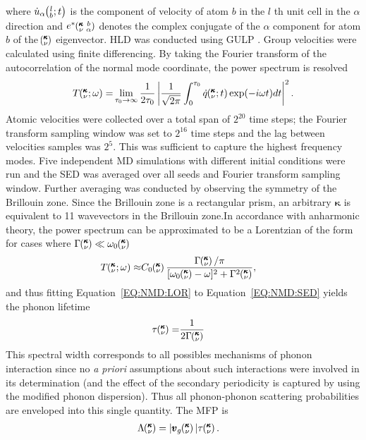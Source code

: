 \documentclass[aps,prb,preprint,preprintnumbers,amsmath,amssymb,floatfix,superscriptaddress]{revtex4}
\newcommand{\kvba}{\mspace{-4.0mu}\left(\mspace{-8.0mu}
\begin{smallmatrix} &\pmb{\kappa} &b \\ &\nu &\alpha\end{smallmatrix}
\mspace{-3.0mu}\right)}
\newcommand{\kvt}{\mspace{-4.0mu}\left(\mspace{-8.0mu}
\begin{smallmatrix}&\pmb{\kappa} \\&\nu\end{smallmatrix}
\mspace{-2.0mu};t\right)}
\newcommand{\kvw}{\mspace{-4.0mu}\left(\mspace{-8.0mu}
\begin{smallmatrix}&\pmb{\kappa} \\&\nu\end{smallmatrix}
\mspace{-2.0mu};\omega\right)}
\newcommand{\kv}{\mspace{-4.0mu}\left(\mspace{-8.0mu}
\begin{smallmatrix}&\pmb{\kappa} \\&\nu\end{smallmatrix}
\mspace{-3.0mu}\right)}
\newcommand{\lbt}{\mspace{-4.0mu}\left(\mspace{-8.0mu}
\begin{smallmatrix}&l \\&b\end{smallmatrix}\mspace{-2.0mu};t\right)}
\begin{document}
where $\dot{u}_{\alpha}\lbt$ is the component of velocity of atom $b$ in the $l$ th unit cell in the $\alpha$ direction and $e^*\kvba$ denotes the complex conjugate of the $\alpha$ component for atom $b$ of the $\kv$ eigenvector. HLD was conducted using GULP \cite{GULP}. Group velocities were calculated using finite differencing. By taking the Fourier transform of the autocorrelation of the normal mode coordinate, the power spectrum is resolved \cite{dove_introduction_1993-3}
\begin{equation}\label{EQ:NMD:SED}
\begin{split}
T\kvw=&\lim_{\tau_0\rightarrow\infty}\frac{1}{2\tau_0}\left|\frac{1}{\sqrt{2\pi}}\int_{0}^{\tau_0}\dot{q}\kvt\exp(-i\omega t)dt\right|^2.\\
\end{split}
\end{equation}
Atomic velocities were collected over a total span of $2^{20}$ time steps; the Fourier transform sampling window was set to $2^{16}$ time steps and the lag between velocities samples was $2^5$. This was sufficient to capture the highest frequency modes. Five independent MD simulations with different initial conditions were run and the SED was averaged over all seeds and Fourier transform sampling window. Further averaging was conducted by observing the symmetry of the Brillouin zone. Since the Brillouin zone is a rectangular prism, an arbitrary $\pmb{\kappa}$ is equivalent to 11 wavevectors in the Brillouin zone.In accordance with anharmonic theory, the power spectrum can be approximated to be a Lorentzian of the form for cases where $\Gamma\kv \ll \omega_0\kv$ \cite{maradudin_scattering_1962}
\begin{equation}\label{EQ:NMD:LOR}
\begin{split}
T\kvw\approx&C_0\kv\frac{\Gamma\kv/\pi}{[\omega_0\kv-\omega]^2+\Gamma^2\kv},
\end{split}
\end{equation}
and thus fitting Equation~\ref{EQ:NMD:LOR} to Equation~\ref{EQ:NMD:SED} yields the phonon lifetime
\begin{equation}\label{EQ:lifetime}
\begin{split}
\tau\kv=&\frac{1}{2\Gamma\kv}
\end{split}
\end{equation}
This spectral width corresponds to all possibles mechanisms of phonon interaction since no \textit{a priori} assumptions about such interactions were involved in its determination (and the effect of the secondary periodicity is captured by using the modified phonon dispersion). Thus all phonon-phonon scattering probabilities are enveloped into this single quantity. The MFP is
\begin{equation}\label{EQ:M:phonon_mfp}
\begin{split}
\Lambda\kv &= |\pmb{v}_{g}\kv {}| \tau\kv.
\end{split}
\end{equation}
\end{document}
